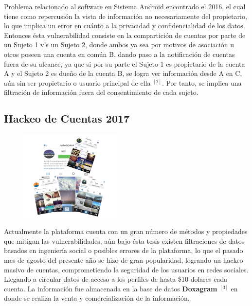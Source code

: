 \documentclass[a4paper,11pt]{article}
\theoremstyle{mytheor}
\begin{document}
Problema relacionado al software en Sistema Android encontrado el 2016, el cual tiene como repercusión la vista de información no necesariamente del propietario, lo que implica un error en cuánto a la privacidad y confidencialidad de los datos. Entonces ésta vulnerabilidad consiste en la compartición de cuentas por parte de un Sujeto 1 v's un Sujeto 2, donde ambos ya sea por motivos de asociación u otros poseen una cuenta en común B, dando paso a la notificación de cuentas fuera de su alcance, ya que si por su parte el Sujeto 1 es propietario de la cuenta A y el Sujeto 2 es dueño de la cuenta B, se logra ver información desde A en C, aún sin ser propietario o usuario principal de ella $^{[2]}$. Por tanto, se implica una filtración de información fuera del consentimiento de cada sujeto.


\subsection{Hackeo de Cuentas 2017}


\begin{figure} 
\vspace{2pt}
  \begin{center}
    \includegraphics[width=0.45\textwidth]{accounts.png}
    \label{fig:databaseUserTable}
  \end{center}
  \vspace{2pt}
\end{figure} 

\bigskip

Actualmente la plataforma cuenta con un gran número de métodos y propiedades que mitigan las vulnerabilidades, aún bajo ésta tesis existen filtraciones de datos basados en ingeniería social o posibles errores de la plataforma, lo que el pasado mes de agosto del presente año se hizo de gran popularidad, logrando un hackeo masivo de cuentas, comprometiendo la seguridad de los usuarios en redes sociales. Llegando a circular datos de acceso a los perfiles de hasta \$10 dolares cada cuenta. La información fue almacenada en la base de datos \textbf{Doxagram} $^{[3]}$ en donde se realiza la venta y comercialización de la información.
\end{document}
